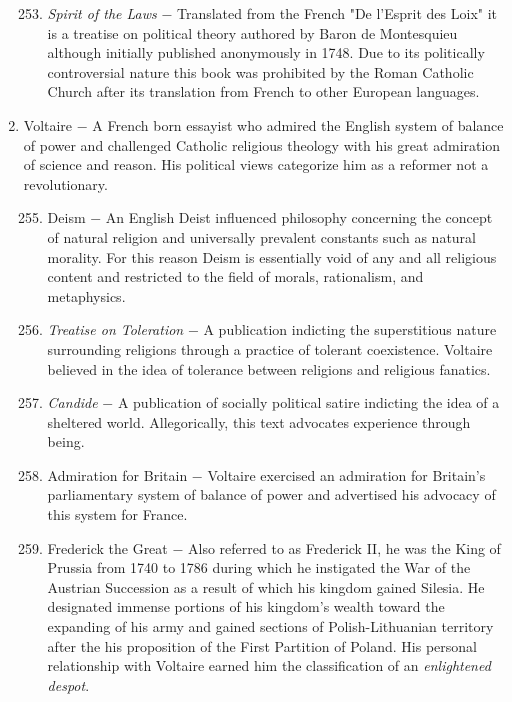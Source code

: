 \documentclass[12pt]{article}
\begin{document}
\begin{enumerate}
\begin{enumerate}[label=\arabic{*}.]
\setcounter{enumii}{252}

\item \textit{Spirit of the Laws} $-$ Translated from the French "De l'Esprit des Loix" it is a treatise on political theory authored by Baron de Montesquieu although initially published anonymously in 1748. Due to its politically controversial nature this book was prohibited by the Roman Catholic Church after its translation from French to other European languages.

\end{enumerate}
\setcounter{enumi}{253}

\item Voltaire $-$ A French born essayist who admired the English system of balance of power and challenged Catholic religious theology with his great admiration of science and reason. His political views categorize him as a reformer not a revolutionary.

\begin{enumerate}[label=\arabic{*}.]
\setcounter{enumii}{254}

\item Deism $-$ An English Deist influenced philosophy concerning the concept of natural religion and universally prevalent constants such as natural morality. For this reason Deism is essentially void of any and all religious content and restricted to the field of morals, rationalism, and metaphysics.

\item \textit{Treatise on Toleration} $-$ A publication indicting the superstitious nature surrounding religions through a practice of tolerant coexistence. Voltaire believed in the idea of tolerance between religions and religious fanatics.

\item \textit{Candide} $-$ A publication of socially political satire indicting the idea of a sheltered world. Allegorically, this text advocates experience through being.

\item Admiration for Britain $-$ Voltaire exercised an admiration for Britain's parliamentary system of balance of power and advertised his advocacy of this system for France.

\item Frederick the Great $-$ Also referred to as Frederick II, he was the King of Prussia from 1740 to 1786 during which he instigated the War of the Austrian Succession as a result of which his kingdom gained Silesia. He designated immense portions of his kingdom's wealth toward the expanding of his army and gained sections of Polish-Lithuanian territory after the his proposition of the First Partition of Poland. His personal relationship with Voltaire earned him the classification of an \textit{enlightened despot}.


\end{enumerate}
\end{enumerate}
\end{document}
